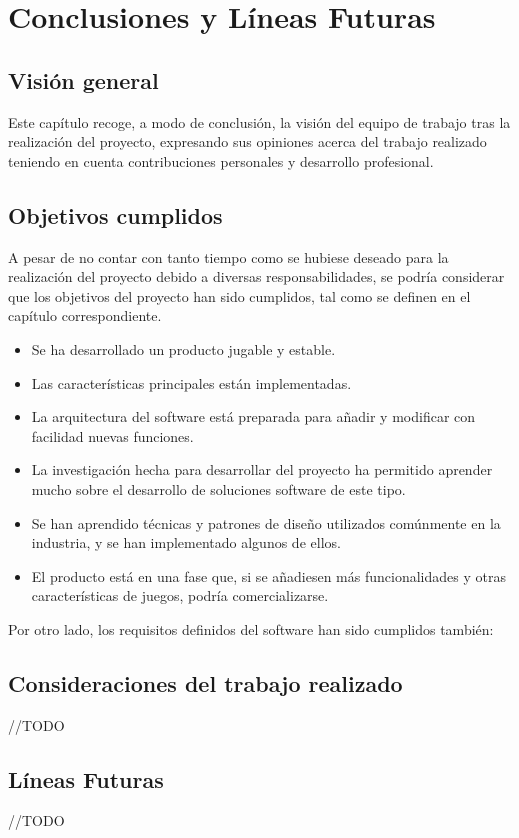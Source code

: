 \chapter{Conclusiones y Líneas Futuras}

\section{Visión general}

	Este capítulo recoge, a modo de conclusión, la visión del equipo de trabajo tras la realización del proyecto, expresando sus opiniones acerca del trabajo realizado teniendo en cuenta contribuciones personales y desarrollo profesional.

\section{Objetivos cumplidos}

	A pesar de no contar con tanto tiempo como se hubiese deseado para la realización del proyecto debido a diversas responsabilidades, se podría considerar que los objetivos del proyecto han sido cumplidos, tal como se definen en el capítulo correspondiente.

	\begin{itemize}

	\item Se ha desarrollado un producto jugable y estable.

	\item Las características principales están implementadas.

	\item La arquitectura del software está preparada para añadir y modificar con facilidad nuevas funciones.

	\item La investigación hecha para desarrollar del proyecto ha permitido aprender mucho sobre el desarrollo de soluciones software de este tipo.

	\item Se han aprendido técnicas y patrones de diseño utilizados comúnmente en la industria, y se han implementado algunos de ellos.

	\item El producto está en una fase que, si se añadiesen más funcionalidades y otras características de juegos, podría comercializarse.

	\end{itemize}

	Por otro lado, los requisitos definidos del software han sido cumplidos también:

	\begin{itemize}


	\end{itemize}

\section{Consideraciones del trabajo realizado}

	//TODO

\section{Líneas Futuras}

	//TODO
